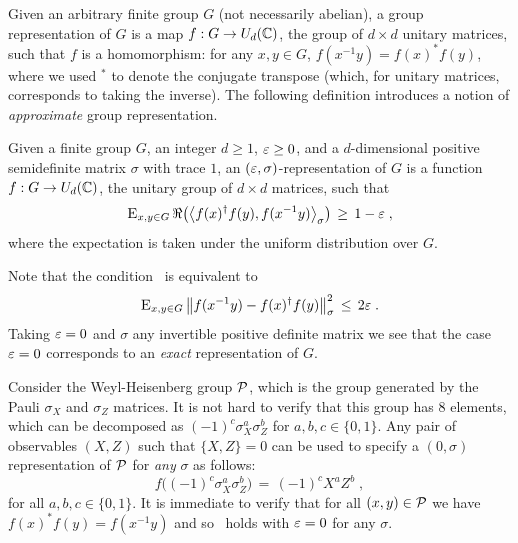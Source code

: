 Given an arbitrary finite group $G$ (not necessarily abelian), a group representation of $G$ is a map $f:G \to U_d(\mathbb{C})$, the group of $d\times d$ unitary matrices, such that $f$ is a homomorphism: for any $x,y\in G$, $f(x^{-1}y)=f(x)^* f(y)$, where we used $^*$ to denote the conjugate transpose (which, for unitary matrices, corresponds to taking the inverse). The following definition introduces a notion of \emph{approximate} group representation.  

\begin{definition}
\label{definition-approx-rep}
Given a finite group $G$, an integer $d\geq 1$, $\varepsilon\geq 0$, and a $d$-dimensional positive semidefinite matrix $\sigma$ with trace $1$, an $(\varepsilon,\sigma)$-representation of $G$ is a function $f: G \to U_d(\mathbb{C})$, the unitary group of $d\times d$ matrices, such that 
\begin{equation}
\label{equation-gh-condition}
\textsc{E}_{x,y\in G} \,\Re\big(\big\langle f(x)^\dagger f(y) ,f(x^{-1}y) \big\rangle_\sigma\big) \,\geq\, 1-\varepsilon\;,
\end{equation} 
where the expectation is taken under the uniform distribution over $G$.
\end{definition}

Note that the condition~ is equivalent to 
\begin{equation}
\label{equation-gh-condition-2}
\textsc{E}_{x,y\in G} \, \big\| f(x^{-1}y) - f(x)^\dagger f(y) \big\|_\sigma^2 \,\leq\, 2\varepsilon\;.
\end{equation}
Taking $\varepsilon=0$ and $\sigma$ any invertible positive definite matrix we see that the case $\varepsilon=0$ corresponds to an \emph{exact} representation of $G$. 

\begin{example}
\label{example-wh-1}
Consider the Weyl-Heisenberg group $\mathcal{P}$, which is the group generated by the Pauli $\sigma_X$ and $\sigma_Z$ matrices. It is not hard to verify that this group has $8$ elements, which can be decomposed as $(-1)^c \sigma_X^a \sigma_Z^b$ for $a,b,c\in\{0,1\}$. Any pair of observables $(X,Z)$ such that $\{X,Z\}=0$ can be used to specify a $(0,\sigma)$ representation of $\mathcal{P}$ for \emph{any} $\sigma$ as follows:
\begin{equation}
\label{equation-def-rep-pauli}
 f\big((-1)^c \sigma_X^a \sigma_Z^b\big) \,=\, (-1)^c X^a Z^b\;,
\end{equation}
for all $a,b,c\in\{0,1\}$. It is immediate to verify that for all $(x,y)\in \mathcal{P}$ we have $f(x)^*f(y)=f(x^{-1}y)$ and so~ holds with $\varepsilon=0$ for any $\sigma$.
\end{example}

